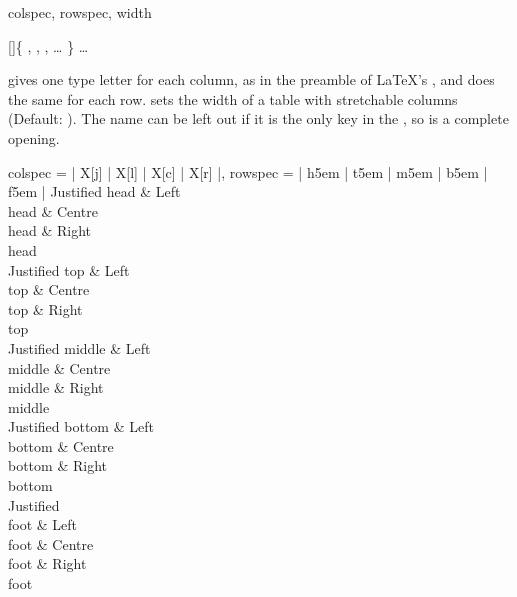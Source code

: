 \begin{codedescribe}[keys]{colspec, rowspec, width}
\begin{codesyntax}
  []\{
      \quad{},
      \quad{},
      \quad{},
      \quad\ldots
      \}
      \quad\ldots
      \tsmacro{\end{tblr}}{}
\end{codesyntax}
 gives one type letter for each column, as in the preamble of \LaTeX's , and  does the same for each row.  sets the width of a table with stretchable columns (Default: ). The name  can be left out if it is the only key in the , so  is a complete opening.
\end{codedescribe}

\begin{codestore}[st = Q-positioning]
  \begin{tblr}{
      colspec = {|  X[j] | X[l] | X[c] | X[r] |},
      rowspec = {| h{5em} | t{5em} | m{5em} | b{5em} | f{5em} |}
    }
    {Justified head}   & {Left \\ head} & {Centre\\ head} & {Right\\ head} \\
    {Justified top}    & {Left \\ top} & {Centre\\ top} & {Right\\ top} \\
    {Justified middle} & {Left \\ middle} & {Centre\\ middle} & {Right\\ middle} \\
    {Justified bottom} & {Left \\ bottom} & {Centre\\ bottom} & {Right\\ bottom} \\
    {Justified                 \\ foot} & {Left\\ foot} & {Centre\\ foot} & {Right\\ foot}
  \end{tblr}
\end{codestore}



